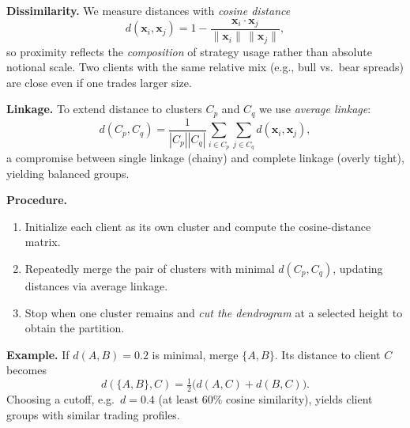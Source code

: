 \documentclass[12pt,a4paper]{report}
\begin{document}
\textbf{Dissimilarity.} We measure distances with \emph{cosine distance}
\[
d(\mathbf{x}_i,\mathbf{x}_j)=1-\frac{\mathbf{x}_i\cdot\mathbf{x}_j}{\lVert \mathbf{x}_i\rVert\,\lVert \mathbf{x}_j\rVert},
\]
so proximity reflects the \emph{composition} of strategy usage rather than absolute notional scale. Two clients with the same relative mix (e.g., bull vs.\ bear spreads) are close even if one trades larger size.

\textbf{Linkage.} To extend distance to clusters $C_p$ and $C_q$ we use \emph{average linkage}:
\[
d(C_p,C_q)=\frac{1}{|C_p||C_q|}\sum_{i\in C_p}\sum_{j\in C_q} d(\mathbf{x}_i,\mathbf{x}_j),
\]
a compromise between single linkage (chainy) and complete linkage (overly tight), yielding balanced groups.

\textbf{Procedure.}
\begin{enumerate}
  \item Initialize each client as its own cluster and compute the cosine-distance matrix.
  \item Repeatedly merge the pair of clusters with minimal $d(C_p,C_q)$, updating distances via average linkage.
  \item Stop when one cluster remains and \emph{cut the dendrogram} at a selected height to obtain the partition.
\end{enumerate}

\textbf{Example.} If $d(A,B)=0.2$ is minimal, merge $\{A,B\}$. Its distance to client $C$ becomes
\[
d(\{A,B\},C)=\tfrac{1}{2}\big(d(A,C)+d(B,C)\big).
\]
Choosing a cutoff, e.g.\ $d=0.4$ (at least $60\%$ cosine similarity), yields client groups with similar trading profiles.









\end{document}
